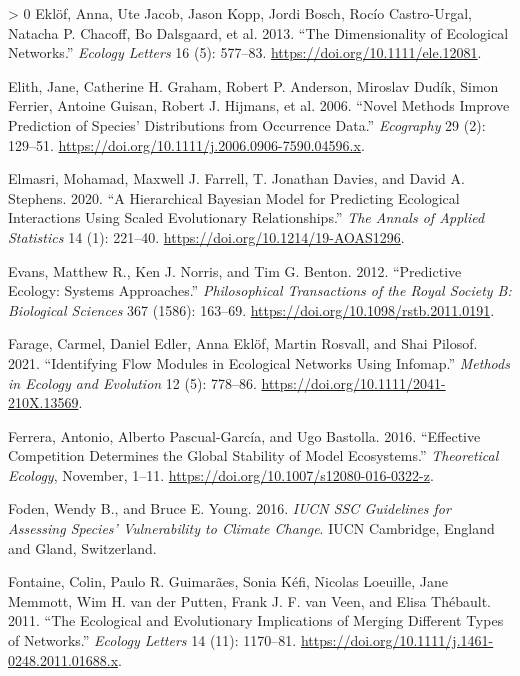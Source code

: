\documentclass[11pt]{article}
\newlength{\cslhangindent}
\newenvironment{CSLReferences}[3] %
 {%
  \setlength{\parindent}{0pt}
  \ifodd #1 \everypar{\setlength{\hangindent}{\cslhangindent}}\ignorespaces\fi
  \ifnum #2 > 0
  \setlength{\parskip}{#2\baselineskip}
  \fi
 }%
 {}
\begin{document}
\begin{CSLReferences}{1}{0}
\leavevmode\hypertarget{ref-Eklof2013DimEco}{}%
Eklöf, Anna, Ute Jacob, Jason Kopp, Jordi Bosch, Rocío Castro-Urgal,
Natacha P. Chacoff, Bo Dalsgaard, et al. 2013. {``The Dimensionality of
Ecological Networks.''} \emph{Ecology Letters} 16 (5): 577--83.
\url{https://doi.org/10.1111/ele.12081}.

\leavevmode\hypertarget{ref-Elith2006NovMet}{}%
Elith, Jane, Catherine H. Graham, Robert P. Anderson, Miroslav Dudík,
Simon Ferrier, Antoine Guisan, Robert J. Hijmans, et al. 2006. {``Novel
Methods Improve Prediction of Species' Distributions from Occurrence
Data.''} \emph{Ecography} 29 (2): 129--51.
\url{https://doi.org/10.1111/j.2006.0906-7590.04596.x}.

\leavevmode\hypertarget{ref-Elmasri2020HieBay}{}%
Elmasri, Mohamad, Maxwell J. Farrell, T. Jonathan Davies, and David A.
Stephens. 2020. {``A Hierarchical Bayesian Model for Predicting
Ecological Interactions Using Scaled Evolutionary Relationships.''}
\emph{The Annals of Applied Statistics} 14 (1): 221--40.
\url{https://doi.org/10.1214/19-AOAS1296}.

\leavevmode\hypertarget{ref-Evans2012PreEco}{}%
Evans, Matthew R., Ken J. Norris, and Tim G. Benton. 2012. {``Predictive
Ecology: Systems Approaches.''} \emph{Philosophical Transactions of the
Royal Society B: Biological Sciences} 367 (1586): 163--69.
\url{https://doi.org/10.1098/rstb.2011.0191}.

\leavevmode\hypertarget{ref-Farage2021IdeFlo}{}%
Farage, Carmel, Daniel Edler, Anna Eklöf, Martin Rosvall, and Shai
Pilosof. 2021. {``Identifying Flow Modules in Ecological Networks Using
Infomap.''} \emph{Methods in Ecology and Evolution} 12 (5): 778--86.
\url{https://doi.org/10.1111/2041-210X.13569}.

\leavevmode\hypertarget{ref-Ferrera2016EffCom}{}%
Ferrera, Antonio, Alberto Pascual-García, and Ugo Bastolla. 2016.
{``Effective Competition Determines the Global Stability of Model
Ecosystems.''} \emph{Theoretical Ecology}, November, 1--11.
\url{https://doi.org/10.1007/s12080-016-0322-z}.

\leavevmode\hypertarget{ref-Foden2016IucSsc}{}%
Foden, Wendy B., and Bruce E. Young. 2016. \emph{IUCN SSC Guidelines for
Assessing Species' Vulnerability to Climate Change}. IUCN Cambridge,
England and Gland, Switzerland.

\leavevmode\hypertarget{ref-Fontaine2011EcoEvo}{}%
Fontaine, Colin, Paulo R. Guimarães, Sonia Kéfi, Nicolas Loeuille, Jane
Memmott, Wim H. van der Putten, Frank J. F. van Veen, and Elisa
Thébault. 2011. {``The Ecological and Evolutionary Implications of
Merging Different Types of Networks.''} \emph{Ecology Letters} 14 (11):
1170--81. \url{https://doi.org/10.1111/j.1461-0248.2011.01688.x}.


\end{CSLReferences}
\end{document}
